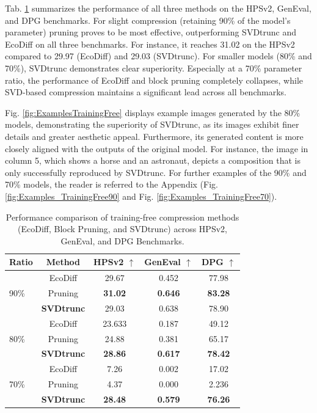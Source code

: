 Tab. \ref{tab:TrainingFreeMethodsBenchmarks} summarizes the performance of all three methods on the HPSv2, GenEval, and DPG benchmarks. For slight compression (retaining 90\% of the model's parameter) pruning proves to be most effective, outperforming \gls{SVD}trunc and EcoDiff on all three benchmarks. For instance, it reaches 31.02 on the HPSv2 compared to 29.97 (EcoDiff) and 29.03 (\gls{SVD}trunc). For smaller models (80\% and 70\%), \gls{SVD}trunc demonstrates clear superiority. Especially at a 70\% parameter ratio, the performance of EcoDiff and block pruning completely collapses, while \gls{SVD}-based compression maintains a significant lead across all benchmarks.



Fig. \ref{fig:ExamplesTrainingFree} displays example images generated by the 80\% models, demonstrating the superiority of \gls{SVD}trunc, as its images exhibit finer details and greater aesthetic appeal. Furthermore, its generated content is more closely aligned with the outputs of the original model. For instance, the image in column 5, which shows a horse and an astronaut, depicts a composition that is only successfully reproduced by \gls{SVD}trunc. For further examples of the 90\% and 70\% models, the reader is referred to the Appendix (Fig. \ref{fig:Examples_TrainingFree90} and Fig. \ref{fig:Examples_TrainingFree70}). 


\vspace{1cm}
	\begin{table}[H]
		
	\centering
	\caption[Benchmark Performance: Training-Free Compression Methods on FLUX.1 {[dev]}]{Performance comparison of training-free compression methods (EcoDiff, Block Pruning, and \gls{SVD}trunc) across HPSv2, GenEval, and DPG Benchmarks.}
	\label{tab:TrainingFreeMethodsBenchmarks}
	\begin{tabular}{@{}lcccc@{}}
		\toprule
		\textbf{Ratio} & \textbf{Method} & \textbf{HPSv2} $\uparrow$ & \textbf{GenEval} $\uparrow$ & \textbf{DPG} $\uparrow$ \\ \midrule
		
		\multirow{3}{*}{90\%}  
		& EcoDiff \cite{EcoDiff} & 29.67 & 0.452 & 77.98 \\
		& Pruning & \textbf{31.02} & \textbf{0.646} & \textbf{83.28} \\
		& \textbf{SVDtrunc}  &29.03 & 0.638 & 78.90 \\ \midrule
		
		\multirow{3}{*}{80\%}  
		& EcoDiff \cite{EcoDiff} & 23.633 & 0.187 &  49.12 \\
		& Pruning & 24.88 & 0.381 & 65.17 \\
		& \textbf{SVDtrunc}  & \textbf{28.86} & \textbf{0.617} & \textbf{78.42} \\ \midrule
		
		\multirow{3}{*}{70\%}  
		& EcoDiff \cite{EcoDiff} & 7.26 & 0.002 & 17.02  \\
		& Pruning & 4.37 & 0.000 & 2.236 \\
		& \textbf{SVDtrunc}  & \textbf{28.48} & \textbf{0.579
		} & \textbf{76.26} \\ \bottomrule
	\end{tabular}
\end{table}

